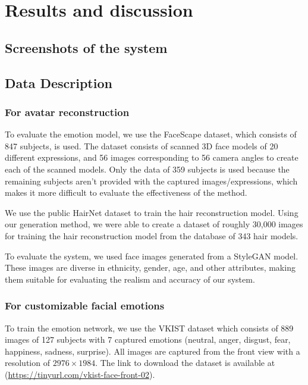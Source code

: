 \section{Results and discussion}\label{sec:results}

\subsection{Screenshots of the system}

\subsection{Data Description}
\subsubsection{For avatar reconstruction}
To evaluate the emotion model, we use the FaceScape dataset, which consists of 847 subjects, is used. The dataset consists of scanned 3D face models of 20 different expressions, and 56 images corresponding to 56 camera angles to create each of the scanned models. Only the data of 359 subjects is used because the remaining subjects aren't provided with the captured images/expressions, which makes it more difficult to evaluate the effectiveness of the method.

We use the public HairNet dataset \cite{zhouHairNetSingleViewHair2018} to train the hair reconstruction model. Using our generation method, we were able to create a dataset of roughly 30,000 images for training the hair reconstruction model from the database of 343 hair models.

To evaluate the system, we used face images generated from a StyleGAN \cite{karrasStyleBasedGeneratorArchitecture2019} model. These images are diverse in ethnicity, gender, age, and other attributes, making them suitable for evaluating the realism and accuracy of our system.

\subsubsection{For customizable facial emotions}
To train the emotion network, we use the VKIST dataset which consists of 889 images of 127 subjects with 7 captured emotions (neutral, anger, disgust, fear, happiness, sadness, surprise). All images are captured from the front view with a resolution of $2976\times1984$. The link to download the dataset is available at (\url{https://tinyurl.com/vkist-face-front-02}).

